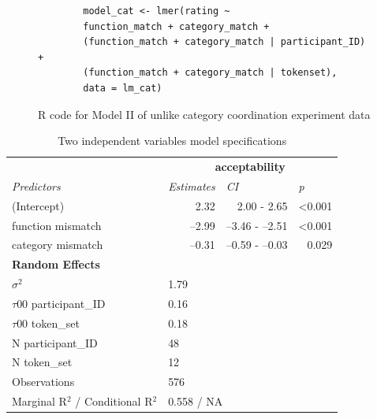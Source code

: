 \begin{figure}[!h]
	\lstset{
		language=R,
		escapechar=@,
		basicstyle=\small\ttfamily,
		columns=fullflexible,
		keepspaces=true
	}
	\begin{lstlisting}
		model_cat <- lmer(rating ~ 
		function_match + category_match +
		(function_match + category_match | participant_ID) +
		(function_match + category_match | tokenset),
		data = lm_cat)\end{lstlisting}
	\caption{R code for Model II of unlike category coordination experiment data}
	\label{fig:R_catmodel}
\end{figure}

\begin{table}[!h]
	\centering
	\begin{tabular}{llrr}
		& \multicolumn{3}{c}{\textbf{acceptability}}                   \\
		\textit{Predictors} & \textit{Estimates}        & \multicolumn{1}{l}{\textit{CI}} & \multicolumn{1}{l}{\textit{p}} \\ \hline
		(Intercept)                  & \multicolumn{1}{r}{2.32}  & {2.00} - {2.65}   & \textless{}0.001 \\
		function mismatch   & \multicolumn{1}{r}{--2.99} & {--3.46} - {--2.51}                   & \textless{}0.001               \\
		category mismatch            & \multicolumn{1}{r}{--0.31} & --0.59 - --0.03 & 0.029            \\
		\multicolumn{4}{l}{\textbf{Random Effects}}                                                 \\
		$\sigma^{2}$                           & \multicolumn{3}{l}{1.79}                                     \\
		$\tau$00 participant\_ID          & \multicolumn{3}{l}{0.16}                                     \\
		$\tau$00 token\_set               & \multicolumn{3}{l}{0.18}                                     \\
		N participant\_ID                        & \multicolumn{3}{l}{48}                                                         \\ 
		N token\_set                 & \multicolumn{3}{l}{12}                                       \\ \hline
		Observations                 & \multicolumn{3}{l}{576}                                      \\
		Marginal R$^{2}$ / Conditional R$^{2}$ & \multicolumn{3}{l}{0.558 / NA}  \\ \hline \hline                            
	\end{tabular}
	\caption{Two independent variables model specifications}
	\label{fig:lmcat}
\end{table}


